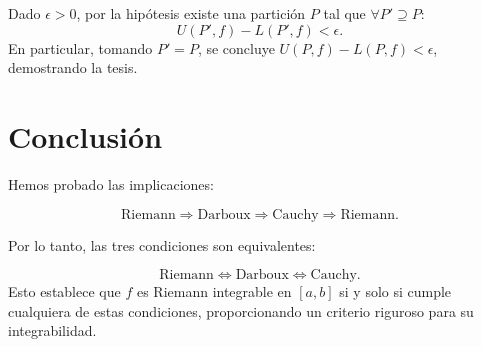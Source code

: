 \documentclass{article}
\begin{document}
Dado $\epsilon > 0$, por la hipótesis existe una partición $P$ tal que $\forall P' \supseteq P$:
\[
U(P', f) - L(P', f) < \epsilon.
\]
En particular, tomando $P' = P$, se concluye $U(P, f) - L(P, f) < \epsilon$, demostrando la tesis.

\section*{Conclusión}
\begin{center}
    Hemos probado las implicaciones:
\end{center}
\[
\text{Riemann} \Rightarrow \text{Darboux} \Rightarrow \text{Cauchy} \Rightarrow \text{Riemann}.
\]

\begin{center}
    Por lo tanto, las tres condiciones son equivalentes:
\end{center}
\[
\text{Riemann} \iff \text{Darboux} \iff \text{Cauchy}.
\]
Esto establece que $f$ es Riemann integrable en $[a, b]$ si y solo si cumple cualquiera de estas condiciones, proporcionando un criterio riguroso para su integrabilidad.
\end{document}

